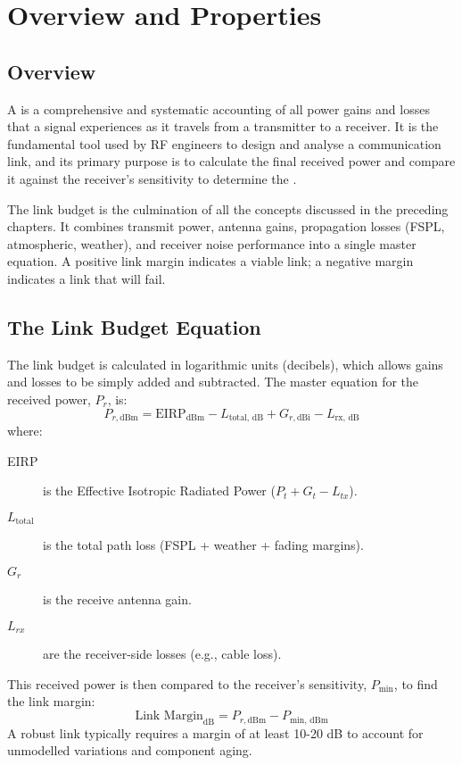 \section{Overview and Properties}

\subsection{Overview}

A  is a comprehensive and systematic accounting of all power gains and losses that a signal experiences as it travels from a transmitter to a receiver. It is the fundamental tool used by RF engineers to design and analyse a communication link, and its primary purpose is to calculate the final received power and compare it against the receiver's sensitivity to determine the .

\begin{keyconcept}
    The link budget is the culmination of all the concepts discussed in the preceding chapters. It combines transmit power, antenna gains, propagation losses (FSPL, atmospheric, weather), and receiver noise performance into a single master equation. A positive link margin indicates a viable link; a negative margin indicates a link that will fail.
\end{keyconcept}


\subsection{The Link Budget Equation}

The link budget is calculated in logarithmic units (decibels), which allows gains and losses to be simply added and subtracted. The master equation for the received power, $P_r$, is:
\begin{equation}
    P_{r, \text{dBm}} = \text{EIRP}_{\text{dBm}} - L_{\text{total, dB}} + G_{r, \text{dBi}} - L_{\text{rx, dB}}
\end{equation}
where:
\begin{description}
    \item[EIRP] is the Effective Isotropic Radiated Power ($P_t + G_t - L_{tx}$).
    \item[$L_{\text{total}}$] is the total path loss (FSPL + weather + fading margins).
    \item[$G_r$] is the receive antenna gain.
    \item[$L_{rx}$] are the receiver-side losses (e.g., cable loss).
\end{description}
This received power is then compared to the receiver's sensitivity, $P_{\text{min}}$, to find the link margin:
\begin{equation}
    \text{Link Margin}_{\text{dB}} = P_{r, \text{dBm}} - P_{\text{min, dBm}}
\end{equation}
A robust link typically requires a margin of at least 10-20 dB to account for unmodelled variations and component aging.


